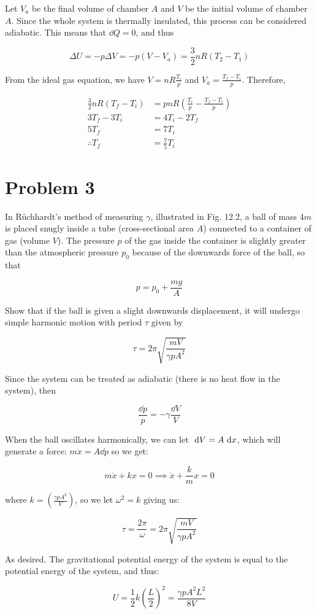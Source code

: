\documentclass{article}
\begin{document}
\begin{enumerate}[(a)]
    \begin{solution}
        Let $V_a$ be the final volume of chamber $A$ and $V$ be the initial volume of chamber $A$.  Since the whole system is thermally insulated, this process can be considered adiabatic. This means that $\dd Q = 0$, and thus

        \[ \Delta U = -p\Delta V = -p(V - V_a) = \frac{3}{2} nR(T_2 - T_1)\]

        From the ideal gas equation, we have $V = nR \frac{T_i}{p}$ and $V_a = \frac{T_f - T_i}{p}$. Therefore, 

        \begin{align*}
            \frac{3}{2}nR(T_f - T_i) &= pnR\left(\frac{T_i}{p} - \frac{T_f - T_i}{p}\right)\\
            3T_f - 3T_i &= 4 T_i - 2 T_f \\
            5 T_f &= 7T_i\\
            \therefore T_f &= \frac{7}{5} T_i
        \end{align*}
        
    \end{solution}
\end{enumerate}

\pagebreak
\section*{Problem 3}
In R\"uchhardt's method of measuring $\gamma$, illustrated in Fig. 12.2, a ball of mass $4m$ is placed snugly inside a tube (cross-sectional area $A$) connected to a container of gas (volume $V$). The pressure $p$ of the gas inside the container is slightly greater than the atmospheric pressure $p_0$ because of the downwards force of the ball, so that 

\[ p = p_0 + \frac{mg}{A}\]

Show that if the ball is given a slight downwards displacement, it will undergo simple harmonic motion with period $\tau$ given by 

\[ \tau = 2\pi \sqrt{\frac{mV}{\gamma pA^2}}\]

\begin{solution}
    Since the system can be treated as adiabatic (there is no heat flow in the system), then 

    \[ \frac{\dd p}{p} = -\gamma \frac{\dd V}{V}\]

    When the ball oscillates harmonically, we can let $\ \mathrm d V = A \ \mathrm d x$, which will generate a force: $m\ddot x = A \dd p$ so we get: 

    \[ m\ddot x  + kx = 0 \implies \ddot x + \frac{k}{m} x = 0\] 

    where $k = \left(\frac{\gamma pA^2}{V}\right)$, so we let $\omega^2 = k$ giving us:

    \[ \tau = \frac{2\pi}{\omega} = 2\pi \sqrt{\frac{mV}{\gamma pA^2}}\]

    As desired. The gravitational potential energy of the system is equal to the potential energy of the system, and thus:

    \[ U = \frac{1}{2}k\left(\frac{L}{2}\right)^2 = \frac{\gamma p A^2L^2}{8V}\]
\end{solution}
\end{document}
